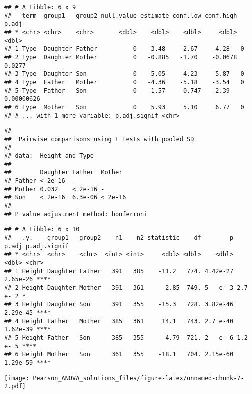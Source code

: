 \documentclass[
]{article}
\begin{document}
\begin{verbatim}
## # A tibble: 6 x 9
##   term  group1   group2 null.value estimate conf.low conf.high      p.adj
## * <chr> <chr>    <chr>       <dbl>    <dbl>    <dbl>     <dbl>      <dbl>
## 1 Type  Daughter Father          0    3.48     2.67     4.28   0         
## 2 Type  Daughter Mother          0   -0.885   -1.70    -0.0678 0.0277    
## 3 Type  Daughter Son             0    5.05     4.23     5.87   0         
## 4 Type  Father   Mother          0   -4.36    -5.18    -3.54   0         
## 5 Type  Father   Son             0    1.57     0.747    2.39   0.00000626
## 6 Type  Mother   Son             0    5.93     5.10     6.77   0         
## # ... with 1 more variable: p.adj.signif <chr>
\end{verbatim}

\begin{verbatim}
## 
##  Pairwise comparisons using t tests with pooled SD 
## 
## data:  Height and Type 
## 
##        Daughter Father  Mother 
## Father < 2e-16  -       -      
## Mother 0.032    < 2e-16 -      
## Son    < 2e-16  6.3e-06 < 2e-16
## 
## P value adjustment method: bonferroni
\end{verbatim}

\begin{verbatim}
## # A tibble: 6 x 10
##   .y.    group1   group2    n1    n2 statistic    df        p    p.adj p.adj.signif
## * <chr>  <chr>    <chr>  <int> <int>     <dbl> <dbl>    <dbl>    <dbl> <chr>       
## 1 Height Daughter Father   391   385    -11.2   774. 4.42e-27 2.65e-26 ****        
## 2 Height Daughter Mother   391   361      2.85  749. 5   e- 3 2.7 e- 2 *           
## 3 Height Daughter Son      391   355    -15.3   728. 3.82e-46 2.29e-45 ****        
## 4 Height Father   Mother   385   361     14.1   743. 2.7 e-40 1.62e-39 ****        
## 5 Height Father   Son      385   355     -4.79  721. 2   e- 6 1.2 e- 5 ****        
## 6 Height Mother   Son      361   355    -18.1   704. 2.15e-60 1.29e-59 ****
\end{verbatim}

\texttt{[image: Pearson\_ANOVA\_solutions\_files/figure-latex/unnamed-chunk-7-2.pdf]}
\end{document}

